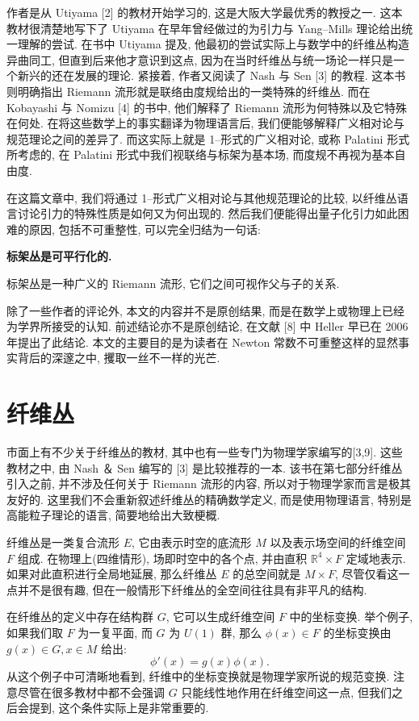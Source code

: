 \documentclass{article}
\begin{document}
\indent 作者是从 Utiyama [2] 的教材开始学习的, 这是大阪大学最优秀的教授之一. 这本教材很清楚地写下了 Utiyama 在早年曾经做过的为引力与 Yang--Mills 理论给出统一理解的尝试. 在书中 Utiyama 提及, 他最初的尝试实际上与数学中的纤维丛构造异曲同工, 但直到后来他才意识到这点, 因为在当时纤维丛与统一场论一样只是一个新兴的还在发展的理论. 紧接着, 作者又阅读了 Nash 与 Sen [3] 的教程. 这本书则明确指出 Riemann 流形就是联络由度规给出的一类特殊的纤维丛. 而在 Kobayashi 与 Nomizu [4] 的书中, 他们解释了 Riemann 流形为何特殊以及它特殊在何处. 在将这些数学上的事实翻译为物理语言后, 我们便能够解释广义相对论与规范理论之间的差异了. 而这实际上就是 1--形式的广义相对论, 或称 Palatini 形式所考虑的, 在 Palatini 形式中我们视联络与标架为基本场, 而度规不再视为基本自由度.
\par
在这篇文章中, 我们将通过 1--形式广义相对论与其他规范理论的比较, 以纤维丛语言讨论引力的特殊性质是如何又为何出现的. 然后我们便能得出量子化引力如此困难的原因, 包括不可重整性, 可以完全归结为一句话:
\begin{center}
\textbf{标架丛是可平行化的.}
\end{center}
标架丛是一种广义的 Riemann 流形, 它们之间可视作父与子的关系.
\par
除了一些作者的评论外, 本文的内容并不是原创结果, 而是在数学上或物理上已经为学界所接受的认知. 前述结论亦不是原创结论, 在文献 [8] 中 Heller 早已在 2006 年提出了此结论. 本文的主要目的是为读者在 Newton 常数不可重整这样的显然事实背后的深邃之中, 攫取一丝不一样的光芒.
\section{纤维丛}
市面上有不少关于纤维丛的教材, 其中也有一些专门为物理学家编写的[3,9]. 这些教材之中, 由 Nash ＆ Sen 编写的 [3] 是比较推荐的一本. 该书在第七部分纤维丛引入之前, 并不涉及任何关于 Riemann 流形的内容, 所以对于物理学家而言是极其友好的. 这里我们不会重新叙述纤维丛的精确数学定义, 而是使用物理语言, 特别是高能粒子理论的语言, 简要地给出大致梗概.

纤维丛是一类复合流形 $E$, 它由表示时空的底流形 $M$ 以及表示场空间的纤维空间 $F$ 组成. 在物理上(四维情形), 场即时空中的各个点, 并由直积 $\mathbb{R}^{4}\times F$ 定域地表示. 如果对此直积进行全局地延展, 那么纤维丛 $E$ 的总空间就是 $ M\times F$, 尽管仅看这一点并不是很有趣, 但在一般情形下纤维丛的全空间往往具有非平凡的结构.

在纤维丛的定义中存在结构群 $G$, 它可以生成纤维空间 $F$ 中的坐标变换. 举个例子, 如果我们取 $F$ 为一复平面, 而 $G$ 为 $U(1)$ 群, 那么 $\phi(x) \in F$ 的坐标变换由 $g(x) \in G, x \in M$ 给出:
\begin{equation}
\phi'(x)=g(x)\phi(x).
\end{equation}
从这个例子中可清晰地看到, 纤维中的坐标变换就是物理学家所说的规范变换. 注意尽管在很多教材中都不会强调 $G$ 只能线性地作用在纤维空间这一点, 但我们之后会提到, 这个条件实际上是非常重要的. 
\end{document}
